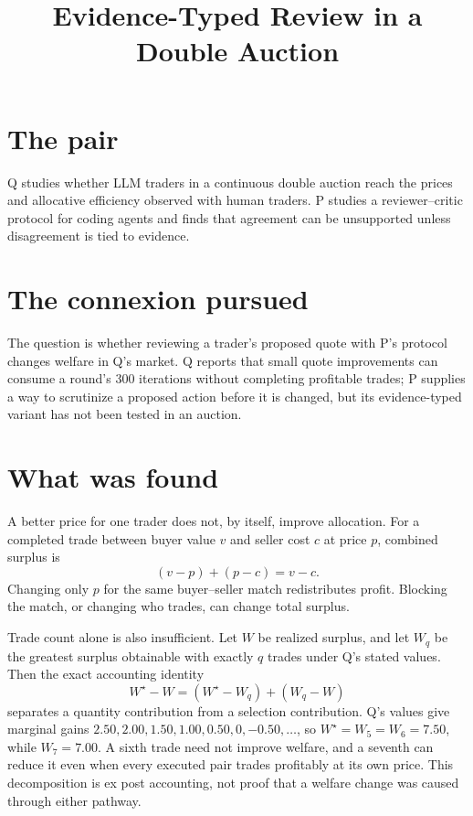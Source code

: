\documentclass{article}
\title{Evidence-Typed Review in a Double Auction}
\begin{document}
\maketitle

\section*{The pair}

Q studies whether LLM traders in a continuous double auction reach the prices and allocative efficiency observed with human traders. P studies a reviewer--critic protocol for coding agents and finds that agreement can be unsupported unless disagreement is tied to evidence. 

\section*{The connexion pursued}

The question is whether reviewing a trader's proposed quote with P's protocol changes welfare in Q's market. Q reports that small quote improvements can consume a round's 300 iterations without completing profitable trades; P supplies a way to scrutinize a proposed action before it is changed, but its evidence-typed variant has not been tested in an auction. 

\section*{What was found}

A better price for one trader does not, by itself, improve allocation. For a completed trade between buyer value \(v\) and seller cost \(c\) at price \(p\), combined surplus is
\[
(v-p)+(p-c)=v-c.
\]
Changing only \(p\) for the same buyer--seller match redistributes profit. Blocking the match, or changing who trades, can change total surplus. 

Trade count alone is also insufficient. Let \(W\) be realized surplus, and let \(W_q\) be the greatest surplus obtainable with exactly \(q\) trades under Q's stated values. Then the exact accounting identity
\[
W^\star-W=(W^\star-W_q)+(W_q-W)
\]
separates a quantity contribution from a selection contribution. Q's values give marginal gains \(2.50, 2.00, 1.50, 1.00, 0.50, 0, -0.50,\ldots\), so \(W^\star=W_5=W_6=7.50\), while \(W_7=7.00\). A sixth trade need not improve welfare, and a seventh can reduce it even when every executed pair trades profitably at its own price. This decomposition is ex post accounting, not proof that a welfare change was caused through either pathway. 
\end{document}
